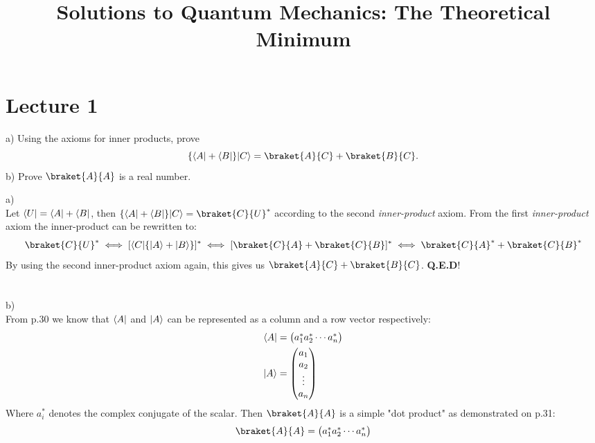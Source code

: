 \documentclass{report}
\title{\Huge{Solutions to Quantum Mechanics: The Theoretical Minimum}}
\author{\huge{}}
\date{}
\DeclarePairedDelimiter\bra{\langle}{\rvert}
\DeclarePairedDelimiter\ket{\lvert}{\rangle}
\begin{document}
\maketitle
\newpage
\pagebreak

\section*{Lecture 1}
{
a) Using the axioms for inner products, prove
\begin{equation*}
\{\bra{A} + \bra{B}\}\ket{C} = \braket{A}{C} + \braket{B}{C}.
\end{equation*}
b) Prove $ \braket{A}{A} $ is a real number.
}

\begin{solution}
a)\\
Let $\bra{U} = \bra{A} + \bra{B}$, then $\{\bra{A} + \bra{B}\}\ket{C} = \braket{C}{U}^*$ according to the second \textit{inner-product} axiom. From the first \textit{inner-product} axiom the inner-product can be rewritten to:
\begin{equation*}
\braket{C}{U}^* \iff [\bra{C}\{\ket{A}+\ket{B}\}]^* \iff [\braket{C}{A}+\braket{C}{B}]^* \iff \braket{C}{A}^* + \braket{C}{B}^*
\end{equation*}
By using the second inner-product axiom again, this gives us $\braket{A}{C} + \braket{B}{C}$. \textbf{Q.E.D}!\\\\\\
b)\\
From p.30 we know that $\bra{A}$ and $\ket{A}$ can be represented as a column and a row vector respectively:
\begin{align*}
\bra{A} &=
\begin{pmatrix}
a_1^* a_2^* \cdots a_n^* 
\end{pmatrix} \\
\ket{A} &=
\begin{pmatrix}
a_1 \\
a_2 \\
\vdots \\
a_n 
\end{pmatrix}
\end{align*}
Where $a_i^*$ denotes the complex conjugate of the scalar. Then $\braket{A}{A}$ is a simple "dot product" as demonstrated on p.31:
\begin{equation*}
\braket{A}{A} =
\begin{pmatrix}
a_1^* a_2^* \cdots a_n^* 
\end{pmatrix}

\end{equation*}
\end{solution}
\end{document}
